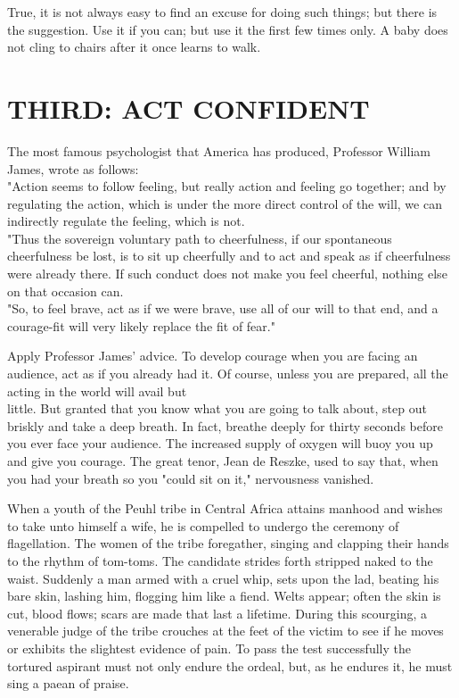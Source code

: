 \documentclass[10pt]{article}
\begin{document}
True, it is not always easy to find an excuse for doing such things; but there is the suggestion. Use it if you can; but use it the first few times only. A baby does not cling to chairs after it once learns to walk.

\section*{THIRD: ACT CONFIDENT}
The most famous psychologist that America has produced, Professor William James, wrote as follows:\\
"Action seems to follow feeling, but really action and feeling go together; and by regulating the action, which is under the more direct control of the will, we can indirectly regulate the feeling, which is not.\\
"Thus the sovereign voluntary path to cheerfulness, if our spontaneous cheerfulness be lost, is to sit up cheerfully and to act and speak as if cheerfulness were already there. If such conduct does not make you feel cheerful, nothing else on that occasion can.\\
"So, to feel brave, act as if we were brave, use all of our will to that end, and a courage-fit will very likely replace the fit of fear."

Apply Professor James' advice. To develop courage when you are facing an audience, act as if you already had it. Of course, unless you are prepared, all the acting in the world will avail but\\
little. But granted that you know what you are going to talk about, step out briskly and take a deep breath. In fact, breathe deeply for thirty seconds before you ever face your audience. The increased supply of oxygen will buoy you up and give you courage. The great tenor, Jean de Reszke, used to say that, when you had your breath so you "could sit on it," nervousness vanished.

When a youth of the Peuhl tribe in Central Africa attains manhood and wishes to take unto himself a wife, he is compelled to undergo the ceremony of flagellation. The women of the tribe foregather, singing and clapping their hands to the rhythm of tom-toms. The candidate strides forth stripped naked to the waist. Suddenly a man armed with a cruel whip, sets upon the lad, beating his bare skin, lashing him, flogging him like a fiend. Welts appear; often the skin is cut, blood flows; scars are made that last a lifetime. During this scourging, a venerable judge of the tribe crouches at the feet of the victim to see if he moves or exhibits the slightest evidence of pain. To pass the test successfully the tortured aspirant must not only endure the ordeal, but, as he endures it, he must sing a paean of praise.
\end{document}

